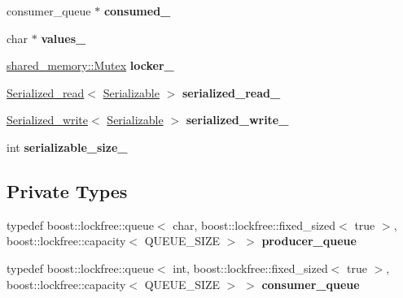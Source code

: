 \begin{DoxyCompactItemize}
consumer\+\_\+queue $\ast$ {\bfseries consumed\+\_\+}
\item 
\mbox{\label{classshared__memory_1_1internal_1_1Exchange__manager__memory_a32794be03e7f992a26fcad1f550a5b33}} 
char $\ast$ {\bfseries values\+\_\+}
\item 
\mbox{\label{classshared__memory_1_1internal_1_1Exchange__manager__memory_a44d72a699c2a76b2ef127f02ee37d26b}} 
\hyperlink{classshared__memory_1_1Mutex}{shared\+\_\+memory\+::\+Mutex} {\bfseries locker\+\_\+}
\item 
\mbox{\label{classshared__memory_1_1internal_1_1Exchange__manager__memory_a3a5127e519eec82ec2a4181eee4ddab5}} 
\hyperlink{classshared__memory_1_1internal_1_1Serialized__read}{Serialized\+\_\+read}$<$ \hyperlink{classSerializable}{Serializable} $>$ {\bfseries serialized\+\_\+read\+\_\+}
\item 
\mbox{\label{classshared__memory_1_1internal_1_1Exchange__manager__memory_a1999cdf0f4f438e448bec0ef86a153b3}} 
\hyperlink{classshared__memory_1_1internal_1_1Serialized__write}{Serialized\+\_\+write}$<$ \hyperlink{classSerializable}{Serializable} $>$ {\bfseries serialized\+\_\+write\+\_\+}
\item 
\mbox{\label{classshared__memory_1_1internal_1_1Exchange__manager__memory_af2d9740e5a2c4498a3d234175c515f26}} 
int {\bfseries serializable\+\_\+size\+\_\+}
\end{DoxyCompactItemize}
\subsection*{Private Types}
\begin{DoxyCompactItemize}
\item 
\mbox{\label{classshared__memory_1_1internal_1_1Exchange__manager__memory_acd7500dc11fa85fdff1c62b3bfec9bb5}} 
typedef boost\+::lockfree\+::queue$<$ char, boost\+::lockfree\+::fixed\+\_\+sized$<$ true $>$, boost\+::lockfree\+::capacity$<$ Q\+U\+E\+U\+E\+\_\+\+S\+I\+ZE $>$ $>$ {\bfseries producer\+\_\+queue}
\item 
\mbox{\label{classshared__memory_1_1internal_1_1Exchange__manager__memory_acfdce096249f1dd920c42d65176ba587}} 
typedef boost\+::lockfree\+::queue$<$ int, boost\+::lockfree\+::fixed\+\_\+sized$<$ true $>$, boost\+::lockfree\+::capacity$<$ Q\+U\+E\+U\+E\+\_\+\+S\+I\+ZE $>$ $>$ {\bfseries consumer\+\_\+queue}
\end{DoxyCompactItemize}
